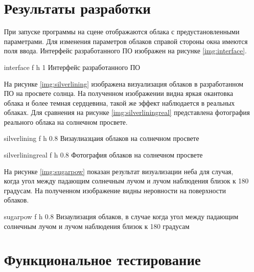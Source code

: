\section{Результаты разработки}

При запуске программы на сцене отображаются облака с предустановленными параметрами. Для изменения параметров облаков справой стороны окна имеются поля ввода. Интерфейс разработанного ПО изображен на рисунке \ref{img:interface}.


{interface} %
{f} %
{h} %
{1\textwidth} %
{Интерфейс разработанного ПО} %


На рисунке \ref{img:silverlining} изображена визуализация облаков в разработанном ПО на просвете солнца. На полученном изображении видна яркая окантовка облака и более темная сердцевина, такой же эффект наблюдается в реальных облаках. Для сравнения на рисунке \ref{img:silverliningreal} представлена фотография реального облака на солнечном просвете.

{silverlining} %
{f} %
{h} %
{0.8\textwidth} %
{Визаулиазцаия облаков на солнечном просвете} %


{silverliningreal} %
{f} %
{h} %
{0.8\textwidth} %
{Фотография облаков на солнечном просвете} %

На рисунке \ref{img:sugarpow} показан результат визуализации неба для случая, когда угол между падающим солнечным лучом и лучом наблюдения близок к 180 градусам. На полученном изображение видны неровности на поверхности облаков. 

{sugarpow} %
{f} %
{h} %
{0.8\textwidth} %
{Визаулизация облаков, в случае когда угол между падающим солнечным лучом и лучом наблюдения близок к 180 градусам} %


\section{Функциональное тестирование}

